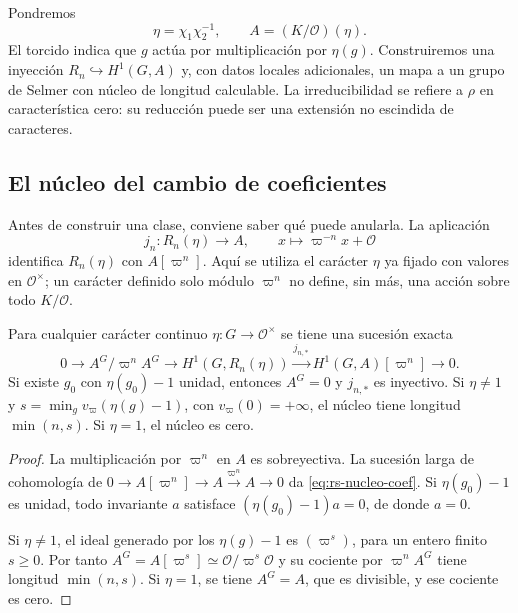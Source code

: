 Pondremos
\begin{equation}
 \eta=\chi_1\chi_2^{-1},\qquad A=(K/\mathcal O)(\eta).
 \label{eq:rs-coeficientes}
\end{equation}
El torcido indica que $g$ actúa por multiplicación por $\eta(g)$.
Construiremos una inyección $R_n\hookrightarrow H^1(G,A)$ y,
con datos locales adicionales, un mapa a un grupo de Selmer con
núcleo de longitud calculable. La irreducibilidad se refiere a
$\rho$ en característica cero: su reducción puede ser una extensión
no escindida de caracteres.

\subsection{El núcleo del cambio de coeficientes}

Antes de construir una clase, conviene saber qué puede anularla.
La aplicación
\begin{equation}
 j_n:R_n(\eta)\longrightarrow A,\qquad
 x\longmapsto\varpi^{-n}x+\mathcal O
 \label{eq:rs-jn}
\end{equation}
identifica $R_n(\eta)$ con $A[\varpi^n]$. Aquí se utiliza el
carácter $\eta$ ya fijado con valores en $\mathcal O^\times$;
un carácter definido solo módulo $\varpi^n$ no define, sin más,
una acción sobre todo $K/\mathcal O$.

\begin{lema}
\label{lem:rs-coeficientes}
Para cualquier carácter continuo $\eta:G\to\mathcal O^\times$ se tiene
una sucesión exacta
\begin{equation}
 0\longrightarrow A^G/\varpi^n A^G
 \longrightarrow H^1(G,R_n(\eta))
 \xrightarrow{j_{n,*}}H^1(G,A)[\varpi^n]
 \longrightarrow0.
 \label{eq:rs-nucleo-coef}
\end{equation}
Si existe $g_0$ con $\eta(g_0)-1$ unidad, entonces $A^G=0$ y
$j_{n,*}$ es inyectivo. Si $\eta\ne1$ y
$s=\min_g v_\varpi(\eta(g)-1)$, con $v_\varpi(0)=+\infty$,
el núcleo tiene longitud $\min(n,s)$. Si $\eta=1$, el núcleo
es cero.
\end{lema}

\begin{proof}
La multiplicación por $\varpi^n$ en $A$ es sobreyectiva. La sucesión
larga de cohomología de
$0\to A[\varpi^n]\to A\xrightarrow{\varpi^n}A\to0$
da \eqref{eq:rs-nucleo-coef}. Si $\eta(g_0)-1$ es unidad,
todo invariante $a$ satisface $(\eta(g_0)-1)a=0$, de donde $a=0$.

Si $\eta\ne1$, el ideal generado por los $\eta(g)-1$ es
$(\varpi^s)$, para un entero finito $s\ge0$. Por tanto
$A^G=A[\varpi^s]\simeq\mathcal O/\varpi^s\mathcal O$ y su
cociente por $\varpi^n A^G$ tiene longitud $\min(n,s)$.
Si $\eta=1$, se tiene $A^G=A$, que es divisible, y ese cociente
es cero.
\end{proof}

